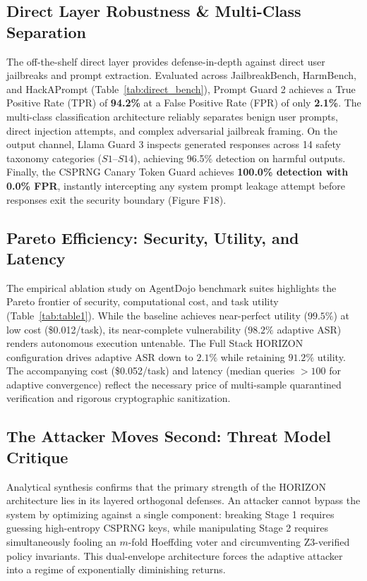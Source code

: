 \documentclass[10pt,a4paper]{article}
\begin{document}
\subsection{Direct Layer Robustness \& Multi-Class Separation}
The off-the-shelf direct layer provides defense-in-depth against direct user jailbreaks and prompt extraction. Evaluated across JailbreakBench, HarmBench, and HackAPrompt (Table~\ref{tab:direct_bench}), Prompt Guard 2 achieves a True Positive Rate (TPR) of \textbf{94.2\%} at a False Positive Rate (FPR) of only \textbf{2.1\%}. The multi-class classification architecture reliably separates benign user prompts, direct injection attempts, and complex adversarial jailbreak framing. On the output channel, Llama Guard 3 inspects generated responses across 14 safety taxonomy categories ($S1$--$S14$), achieving 96.5\% detection on harmful outputs. Finally, the CSPRNG Canary Token Guard achieves \textbf{100.0\% detection with 0.0\% FPR}, instantly intercepting any system prompt leakage attempt before responses exit the security boundary (Figure F18).

\subsection{Pareto Efficiency: Security, Utility, and Latency}
The empirical ablation study on AgentDojo benchmark suites highlights the Pareto frontier of security, computational cost, and task utility (Table~\ref{tab:table1}). While the baseline achieves near-perfect utility ($99.5\%$) at low cost (\$0.012/task), its near-complete vulnerability ($98.2\%$ adaptive ASR) renders autonomous execution untenable. The Full Stack HORIZON configuration drives adaptive ASR down to $2.1\%$ while retaining $91.2\%$ utility. The accompanying cost (\$0.052/task) and latency (median queries $>100$ for adaptive convergence) reflect the necessary price of multi-sample quarantined verification and rigorous cryptographic sanitization.

\subsection{The Attacker Moves Second: Threat Model Critique}
Analytical synthesis confirms that the primary strength of the HORIZON architecture lies in its layered orthogonal defenses. An attacker cannot bypass the system by optimizing against a single component: breaking Stage 1 requires guessing high-entropy CSPRNG keys, while manipulating Stage 2 requires simultaneously fooling an $m$-fold Hoeffding voter and circumventing Z3-verified policy invariants. This dual-envelope architecture forces the adaptive attacker into a regime of exponentially diminishing returns.
\end{document}
